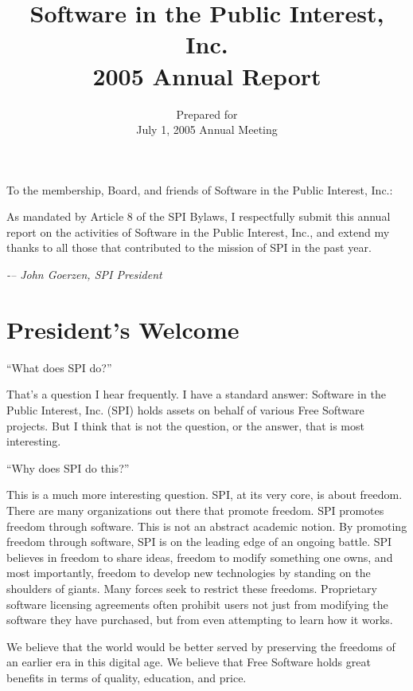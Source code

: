 \documentclass[letterpaper]{report}
\begin{document}
\title{Software in the Public Interest, Inc.\\
2005 Annual Report}
\date{Prepared for\\
July 1, 2005 Annual Meeting}

\maketitle

To the membership, Board, and friends of Software in the Public Interest,
Inc.:

As mandated by Article 8 of the SPI Bylaws, I respectfully submit this
annual report on the activities of Software in the Public Interest, Inc.,
and extend my thanks to all those that contributed to the mission of SPI in
the past year.

\emph{-– John Goerzen, SPI President}

\newpage

\tableofcontents

\newpage

\chapter{President's Welcome}
\label{sec:president}

``What does SPI do?''

That's a question I hear frequently. I have a standard answer: Software in
the Public Interest, Inc. (SPI) holds assets on behalf of various Free
Software projects. But I think that is not the question, or the answer,
that is most interesting.

``Why does SPI do this?''

This is a much more interesting question. SPI, at its very core, is about
freedom. There are many organizations out there that promote freedom. SPI
promotes freedom through software. This is not an abstract academic notion.
By promoting freedom through software, SPI is on the leading edge of an
ongoing battle. SPI believes in freedom to share ideas, freedom to modify
something one owns, and most importantly, freedom to develop new
technologies by standing on the shoulders of giants. Many forces seek to
restrict these freedoms.  Proprietary software licensing agreements often
prohibit users not just from modifying the software they have purchased,
but from even attempting to learn how it works.

We believe that the world would be better served by preserving the freedoms
of an earlier era in this digital age. We believe that Free Software holds
great benefits in terms of quality, education, and price.
\end{document}
